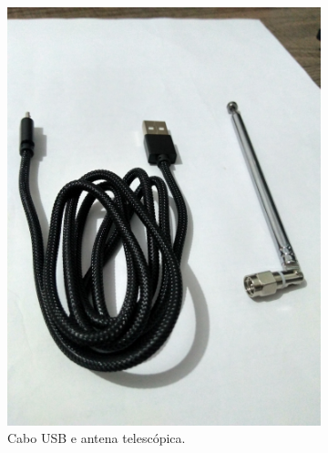 \documentclass[
  12pt,				%
  openright,			%
  twoside,			%
  a4paper,			%
  english,			%
  french,				%
  spanish,			%
  brazil,				%
  ]{abntex2}
\begin{document}


\newpage
\begin{figure}[!htb]
  \centering
  \begin{subfigure}[b]{0.45\linewidth}
    \centering
    \includegraphics[width=\linewidth]{figures/hackrf/hack_rf_cabo_usb_antena_linear.jpg}
    \caption{Cabo USB e antena telescópica.}
    \label{fig:hack_rf_cabo_usb_antena_linear}
  \end{subfigure}
  \hspace{0.5cm}
  \begin{subfigure}[b]{0.45\linewidth}
    \centering

\end{subfigure}
\end{figure}
\end{document}
